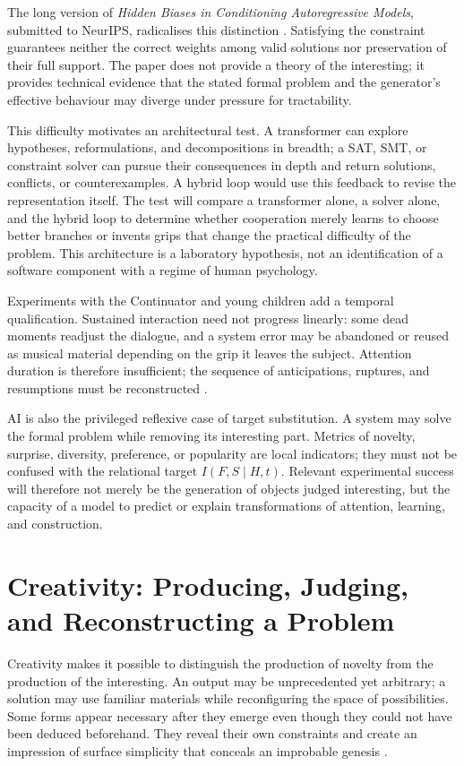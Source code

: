 \documentclass[11pt,a4paper]{article}
\begin{document}
The long version of \emph{Hidden Biases in Conditioning Autoregressive Models},
submitted to NeurIPS, radicalises this distinction
\parencite{pachet2026biases}. Satisfying the constraint guarantees neither the
correct weights among valid solutions nor preservation of their full support.
The paper does not provide a theory of the interesting; it provides technical
evidence that the stated formal problem and the generator's effective behaviour
may diverge under pressure for tractability.

This difficulty motivates an architectural test. A transformer can explore
hypotheses, reformulations, and decompositions in breadth; a SAT, SMT, or
constraint solver can pursue their consequences in depth and return solutions,
conflicts, or counterexamples. A hybrid loop would use this feedback to revise
the representation itself. The test will compare a transformer alone, a solver
alone, and the hybrid loop to determine whether cooperation merely learns to
choose better branches or invents grips that change the practical difficulty of
the problem. This architecture is a laboratory hypothesis, not an
identification of a software component with a regime of human psychology.

Experiments with the Continuator and young children add a temporal qualification.
Sustained interaction need not progress linearly: some dead moments readjust the
dialogue, and a system error may be abandoned or reused as musical material depending
on the grip it leaves the subject. Attention duration is therefore insufficient; the
sequence of anticipations, ruptures, and resumptions must be reconstructed
\parencite{addessi2005experiments,addessi2006flowmachine}.

AI is also the privileged reflexive case of target substitution. A
system may solve the formal problem while removing its interesting part.
Metrics of novelty, surprise, diversity, preference, or popularity are local
indicators; they must not be confused with the relational target
\(I(F,S\mid H,t)\). Relevant experimental success will therefore not merely be
the generation of objects judged interesting, but the capacity of a model to
predict or explain transformations of attention, learning, and construction.

\section{Creativity: Producing, Judging, and Reconstructing a Problem}

Creativity makes it possible to distinguish the production of novelty from the
production of the interesting. An output may be unprecedented yet arbitrary; a
solution may use familiar materials while reconfiguring the space of
possibilities. Some forms appear necessary after they emerge even though they
could not have been deduced beforehand. They reveal their own constraints and
create an impression of surface simplicity that conceals an improbable genesis
\parencite{pachet2026impossibilite,pachet2027virtuosite}.
\end{document}
